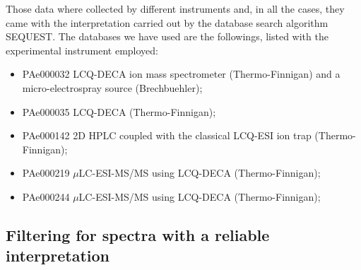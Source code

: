 Those data where collected by different instruments and, in all the cases, they came
with the interpretation carried out by the database search algorithm SEQUEST.
The databases we have used are the followings, listed with the experimental
instrument employed:
\begin{itemize}
  \item PAe000032 \cite{schnapp2006mining} LCQ-DECA ion mass spectrometer
(Thermo-Finnigan) and a micro-electrospray source (Brechbuehler);
  \item PAe000035 \cite{schnapp2006mining} LCQ-DECA (Thermo-Finnigan);
  \item PAe000142 \cite{maynard2004characterizing} 2D HPLC coupled with the
classical LCQ-ESI ion trap (Thermo-Finnigan);
  \item PAe000219 \cite{goo2003proteomic} $\mu$LC-ESI-MS/MS using LCQ-DECA
(Thermo-Finnigan);
  \item PAe000244 \cite{goo2003proteomic} $\mu$LC-ESI-MS/MS using LCQ-DECA
(Thermo-Finnigan);
\end{itemize}


\subsection{Filtering for spectra with a reliable interpretation}


